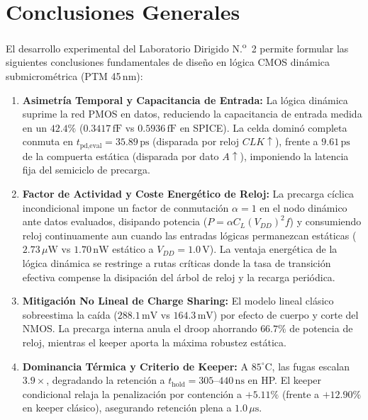 \clearpage
\section{Conclusiones Generales}
\label{sec:conclusiones}

El desarrollo experimental del Laboratorio Dirigido N.\textsuperscript{o}~2 permite formular las siguientes conclusiones fundamentales de diseño en lógica CMOS dinámica submicrométrica (PTM 45\,nm):

\begin{enumerate}[leftmargin=1.5em,itemsep=0.03em,parsep=0pt,topsep=0.05em]
  \item \textbf{Asimetría Temporal y Capacitancia de Entrada:} La lógica dinámica suprime la red PMOS en datos, reduciendo la capacitancia de entrada medida en un $42.4\%$ ($0.3417\,\text{fF}$ vs $0.5936\,\text{fF}$ en SPICE). La celda dominó completa conmuta en $t_{\text{pd,eval}} = 35.89\,\text{ps}$ (disparada por reloj $CLK\uparrow$), frente a $9.61\,\text{ps}$ de la compuerta estática (disparada por dato $A\uparrow$), imponiendo la latencia fija del semiciclo de precarga.
  \item \textbf{Factor de Actividad y Coste Energético de Reloj:} La precarga cíclica incondicional impone un factor de conmutación $\alpha = 1$ en el nodo dinámico ante datos evaluados, disipando potencia ($P = \alpha C_L (V_{DD})^2 f$) y consumiendo reloj continuamente aun cuando las entradas lógicas permanezcan estáticas ($2.73\,\mu\text{W}$ vs $1.70\,\text{nW}$ estático a $V_{DD}=1.0\,\text{V}$). La ventaja energética de la lógica dinámica se restringe a rutas críticas donde la tasa de transición efectiva compense la disipación del árbol de reloj y la recarga periódica.
  \item \textbf{Mitigación No Lineal de Charge Sharing:} El modelo lineal clásico sobreestima la caída ($288.1\,\text{mV}$ vs $164.3\,\text{mV}$) por efecto de cuerpo y corte del NMOS. La precarga interna anula el droop ahorrando $66.7\%$ de potencia de reloj, mientras el keeper aporta la máxima robustez estática.
  \item \textbf{Dominancia Térmica y Criterio de Keeper:} A $85^\circ\text{C}$, las fugas escalan $3.9\times$, degradando la retención a $t_{\text{hold}} = 305\text{--}440\,\text{ns}$ en HP. El keeper condicional relaja la penalización por contención a $+5.11\%$ (frente a $+12.90\%$ en keeper clásico), asegurando retención plena a $1.0\,\mu\text{s}$.

\end{enumerate}
